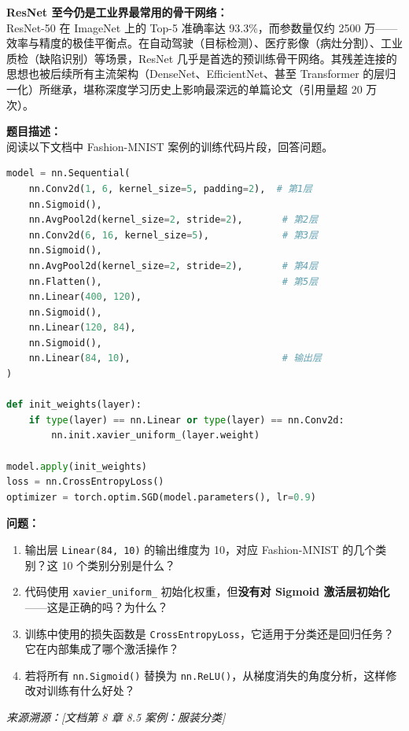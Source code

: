 \documentclass[a4paper,11pt]{ctexart}
\begin{document}
\begin{appbox}[现实应用场景]
    \textbf{ResNet 至今仍是工业界最常用的骨干网络：}\\
    ResNet-50 在 ImageNet 上的 Top-5 准确率达 93.3\%，而参数量仅约 2500 万——效率与精度的极佳平衡点。在自动驾驶（目标检测）、医疗影像（病灶分割）、工业质检（缺陷识别）等场景，ResNet 几乎是首选的预训练骨干网络。其残差连接的思想也被后续所有主流架构（DenseNet、EfficientNet、甚至 Transformer 的层归一化）所继承，堪称深度学习历史上影响最深远的单篇论文（引用量超 20 万次）。
\end{appbox}


\begin{problembox}
    \textbf{题目描述：}\\
    阅读以下文档中 Fashion-MNIST 案例的训练代码片段，回答问题。

    \begin{lstlisting}[language=Python]
model = nn.Sequential(
    nn.Conv2d(1, 6, kernel_size=5, padding=2),  # 第1层
    nn.Sigmoid(),
    nn.AvgPool2d(kernel_size=2, stride=2),       # 第2层
    nn.Conv2d(6, 16, kernel_size=5),             # 第3层
    nn.Sigmoid(),
    nn.AvgPool2d(kernel_size=2, stride=2),       # 第4层
    nn.Flatten(),                                # 第5层
    nn.Linear(400, 120),
    nn.Sigmoid(),
    nn.Linear(120, 84),
    nn.Sigmoid(),
    nn.Linear(84, 10),                           # 输出层
)

def init_weights(layer):
    if type(layer) == nn.Linear or type(layer) == nn.Conv2d:
        nn.init.xavier_uniform_(layer.weight)

model.apply(init_weights)
loss = nn.CrossEntropyLoss()
optimizer = torch.optim.SGD(model.parameters(), lr=0.9)
    \end{lstlisting}

    \vspace{0.2cm}
    \textbf{问题：}
    \begin{enumerate}[(1)]
        \item 输出层 \texttt{Linear(84, 10)} 的输出维度为 10，对应 Fashion-MNIST 的几个类别？这 10 个类别分别是什么？
        \item 代码使用 \texttt{xavier\_uniform\_} 初始化权重，但\textbf{没有对 Sigmoid 激活层初始化}——这是正确的吗？为什么？
        \item 训练中使用的损失函数是 \texttt{CrossEntropyLoss}，它适用于分类还是回归任务？它在内部集成了哪个激活操作？
        \item 若将所有 \texttt{nn.Sigmoid()} 替换为 \texttt{nn.ReLU()}，从梯度消失的角度分析，这样修改对训练有什么好处？
    \end{enumerate}

    \vspace{0.2cm}
    {\color{gray}\small\textit{来源溯源：[文档第 8 章 8.5 案例：服装分类]}}
\end{problembox}
\end{document}
